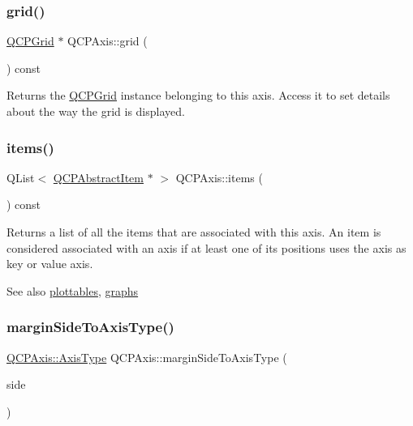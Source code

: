 \subsubsection{\texorpdfstring{grid()}{grid()}}
{\footnotesize\ttfamily \hyperlink{classQCPGrid}{Q\+C\+P\+Grid} $\ast$ Q\+C\+P\+Axis\+::grid (\begin{DoxyParamCaption}{ }\end{DoxyParamCaption}) const\hspace{0.3cm}{\ttfamily [inline]}}

Returns the \hyperlink{classQCPGrid}{Q\+C\+P\+Grid} instance belonging to this axis. Access it to set details about the way the grid is displayed. \mbox{\label{classQCPAxis_a42761bc68e2f3a9f68549d45b73f705b}} 
\subsubsection{\texorpdfstring{items()}{items()}}
{\footnotesize\ttfamily Q\+List$<$ \hyperlink{classQCPAbstractItem}{Q\+C\+P\+Abstract\+Item} $\ast$ $>$ Q\+C\+P\+Axis\+::items (\begin{DoxyParamCaption}{ }\end{DoxyParamCaption}) const}

Returns a list of all the items that are associated with this axis. An item is considered associated with an axis if at least one of its positions uses the axis as key or value axis.

\begin{DoxySeeAlso}{See also}
\hyperlink{classQCPAxis_ac5e0f6f65c75efb5fd32275d6e4ef0d6}{plottables}, \hyperlink{classQCPAxis_ad590c0da223697a2727f97a520870fec}{graphs} 
\end{DoxySeeAlso}
\mbox{\label{classQCPAxis_ac0a6b77bd52bec6c81cd62d167cfeba6}} 
\subsubsection{\texorpdfstring{margin\+Side\+To\+Axis\+Type()}{marginSideToAxisType()}}
{\footnotesize\ttfamily \hyperlink{classQCPAxis_ae2bcc1728b382f10f064612b368bc18a}{Q\+C\+P\+Axis\+::\+Axis\+Type} Q\+C\+P\+Axis\+::margin\+Side\+To\+Axis\+Type (\begin{DoxyParamCaption}\item[{\hyperlink{namespaceQCP_a7e487e3e2ccb62ab7771065bab7cae54}{Q\+C\+P\+::\+Margin\+Side}}]{side }\end{DoxyParamCaption})\hspace{0.3cm}{\ttfamily [static]}}

